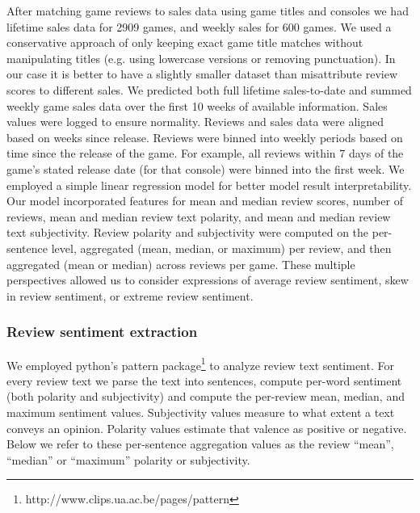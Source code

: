 \documentclass[letterpaper]{article}
\begin{document}
After matching game reviews to sales data using game titles and consoles we had lifetime sales data for 2909 games, and weekly sales for 600 games. We used a conservative approach of only keeping exact game title matches without manipulating titles (e.g. using lowercase versions or removing punctuation). In our case it is better to have a slightly smaller dataset than misattribute review scores to different sales. We predicted both full lifetime sales-to-date and summed weekly game sales data over the first 10 weeks of available information. Sales values were logged to ensure normality. Reviews and sales data were aligned based on weeks since release. Reviews were binned into weekly periods based on time since the release of the game. For example, all reviews within 7 days of the game's stated release date (for that console) were binned into the first week. We employed a simple linear regression model for better model result interpretability. Our model incorporated features for mean and median review scores, number of reviews, mean and median review text polarity, and mean and median review text subjectivity. Review polarity and subjectivity were computed on the per-sentence level, aggregated (mean, median, or maximum) per review, and then aggregated (mean or median) across reviews per game. These multiple perspectives allowed us to consider expressions of average review sentiment, skew in review sentiment, or extreme review sentiment.

\subsubsection{Review sentiment extraction}
We employed python's pattern package\footnote{http://www.clips.ua.ac.be/pages/pattern} to analyze review text sentiment. For every review text we parse the text into sentences, compute per-word sentiment (both polarity and subjectivity) and compute the per-review mean, median, and maximum sentiment values. Subjectivity values measure to what extent a text conveys an opinion. Polarity values estimate that valence as positive or negative. Below we refer to these per-sentence aggregation values as the review ``mean'', ``median'' or ``maximum'' polarity or subjectivity.
\end{document}
